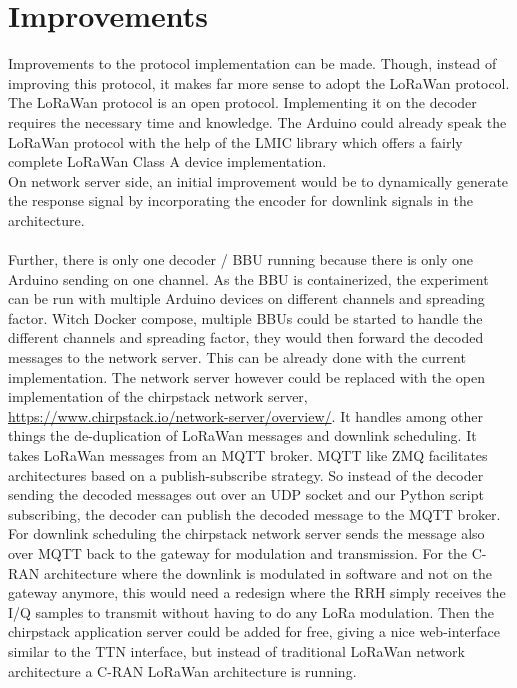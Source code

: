 \section{Improvements}
Improvements to the protocol implementation can be made. Though, instead
of improving this protocol, it makes far more sense to adopt the LoRaWan protocol.
The LoRaWan protocol is an open protocol. Implementing it on the decoder requires the 
necessary time and knowledge. The Arduino could already speak the LoRaWan protocol with 
the help of the LMIC library which offers a fairly complete LoRaWan Class A device implementation.
\\
On network server side, an initial improvement would be to dynamically generate the response signal
by incorporating the encoder for downlink signals in the architecture.
\\ \\
Further, there is only one decoder / BBU running because there is only one Arduino sending on one channel.
As the BBU is containerized, the experiment can be run with multiple Arduino devices on different 
channels and spreading factor. Witch Docker compose, multiple BBUs could be started to handle the different 
channels and spreading factor, they would then forward the decoded messages to the network server.
This can be already done with the current implementation. The network server however could be replaced 
with the open implementation of the chirpstack network server, \url{https://www.chirpstack.io/network-server/overview/}. 
It handles among other things the de-duplication of LoRaWan messages and downlink scheduling.
It takes LoRaWan messages from an MQTT broker. MQTT like ZMQ facilitates architectures based on a publish-subscribe strategy. So instead of the decoder sending the decoded messages 
out over an UDP socket and our Python script subscribing, the decoder can publish the decoded message to the 
MQTT broker. For downlink scheduling the chirpstack network server sends the message also over MQTT
back to the gateway for modulation and transmission. For the C-RAN architecture where the downlink is modulated 
in software and not on the gateway anymore, this would need a redesign where the RRH simply receives the I/Q samples
to transmit without having to do any LoRa modulation. Then the chirpstack application server could be 
added for free, giving a nice web-interface similar to the TTN interface, but instead of 
traditional LoRaWan network architecture a C-RAN LoRaWan architecture is running.
\\ \\
